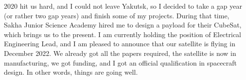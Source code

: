 \documentclass[letter,11pt]{article}
\begin{document}
\begin{justify}
    2020 hit us hard, and I could not leave Yakutsk, so I decided to take a gap year (or rather two gap years) and finish some of my projects. During that time, Sakha Junior Science Academy hired me to design a payload for their CubeSat, which brings us to the present. I am currently holding the position of Electrical Engineering Lead, and I am pleased to announce that our satellite is flying in December 2022. We already got all the papers required, the satellite is now in manufacturing, we got funding, and I got an official qualification in spacecraft design. In other words, things are going well.
    \end{justify}
\end{document}
